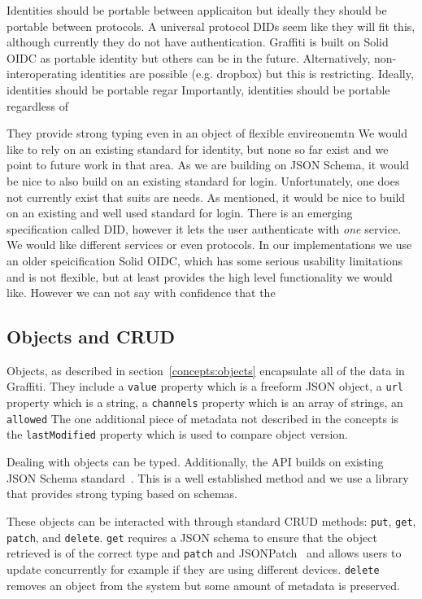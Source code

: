 Identities should be portable between applicaiton but ideally they
should be portable between protocols. A universal protocol DIDs
seem like they will fit this, although currently they do not have authentication.
Graffiti is built on Solid OIDC as portable identity but others can be in the future.
Alternatively, non-interoperating identities are possible (e.g. dropbox) but this is restricting.
Ideally, identities should be portable regar
Importantly, identities should be portable regardless of

They provide strong typing even in an object of flexible envireonemtn
We would like to rely on an existing standard for identity,
but none so far exist and we point to future work in that
area.
As we are building on JSON Schema, it would be nice to also build on
an existing standard for login. Unfortunately, one does not currently
exist that suits are needs.
As mentioned, it would be nice to build on an existing and
well used standard for login. There is an emerging specification
called DID, however it lets the user authenticate with \emph{one}
service. We would like different services or even protocols.
In our implementations we use an older speicification Solid OIDC,
which has some serious usability limitations and is not flexible,
but at least provides the high level functionality we would like.
However we can not say with confidence that the

\subsection{Objects and CRUD}

Objects, as described in section~\ref{concepts:objects} encapsulate
all of the data in Graffiti.
They include a \texttt{value} property which is a freeform JSON object,
a \texttt{url} property which is a string,
a \texttt{channels} property which is an array of strings,
an \texttt{allowed}
The one additional piece of metadata not described in the concepts
is the \texttt{lastModified} property which is used to compare object version.

Dealing with objects can be typed.
Additionally, the API builds on existing JSON Schema standard~\cite{jsonschema}.
This is a well established method and we use a library that
provides strong typing based on schemas.

These objects can be interacted with through standard CRUD methods:
\texttt{put}, \texttt{get}, \texttt{patch}, and \texttt{delete}.
\texttt{get} requires a JSON schema to ensure that the object
retrieved is of the correct type and \texttt
\texttt{patch} and JSONPatch~\cite{jsonpatch} and allows users to update
concurrently for example if they are using different devices.
\texttt{delete} removes an object from the system but some amount of
metadata is preserved.

